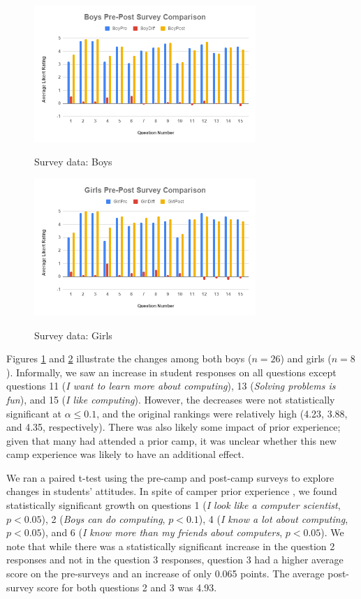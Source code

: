 \begin{figure}
\includegraphics[width=3.3in]{images/boys}
\label{figure:boys}
\caption{Survey data: Boys}
\end{figure}

\begin{figure}
\includegraphics[width=3.3in]{images/girls}
\label{figure:girls}
\caption{Survey data: Girls}
\end{figure}

Figures \ref{figure:boys} and \ref{figure:girls} illustrate the changes
among both boys ($n=26$) and girls ($n=8$).
Informally, we saw an increase in student responses on all questions
except questions 11 (\textit{I want to learn more about computing}), 
13 (\textit{Solving problems is fun}), and 15 (\textit{I like computing}).
However, the decreases were not statistically significant at $\alpha\le 0.1$,
and the original rankings were relatively high (4.23, 3.88, and 4.35,
respectively).  There was also likely some impact of prior experience;
given that many had attended a prior camp, it was unclear whether this
new camp experience was likely to have an additional effect.

We ran a paired t-test using the pre-camp and post-camp surveys to
explore changes in students' attitudes.  In spite of camper prior
experience , we found statistically significant growth on questions
1 (\textit{I look like a computer scientist}, $p < 0.05$), 2
(\textit{Boys can do computing}, $p < 0.1$), 4 (\textit{I know a
lot about computing}, $p < 0.05$), and 6 (\textit{I know more than
my friends about computers}, $p < 0.05$).  We note that while there
was a statistically significant increase in the question 2 responses
and not in the question 3 responses, question 3 had a higher average
score on the pre-surveys and an increase of only 0.065 points.
The average post-survey score for both questions 2 and 3 was 4.93.

